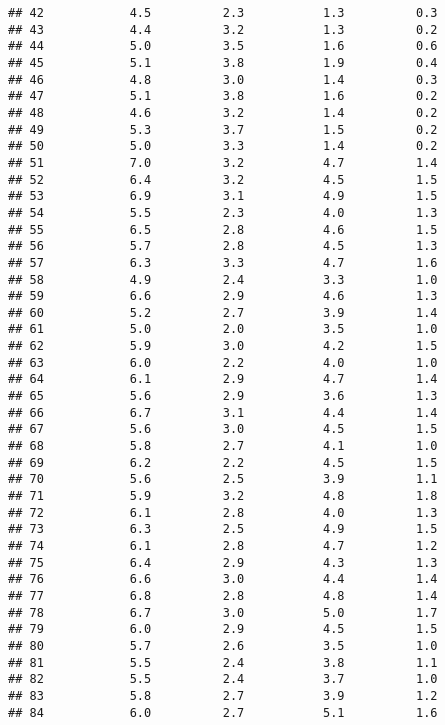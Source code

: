 \documentclass[
]{article}
\begin{document}
\begin{verbatim}
## 42            4.5          2.3           1.3          0.3
## 43            4.4          3.2           1.3          0.2
## 44            5.0          3.5           1.6          0.6
## 45            5.1          3.8           1.9          0.4
## 46            4.8          3.0           1.4          0.3
## 47            5.1          3.8           1.6          0.2
## 48            4.6          3.2           1.4          0.2
## 49            5.3          3.7           1.5          0.2
## 50            5.0          3.3           1.4          0.2
## 51            7.0          3.2           4.7          1.4
## 52            6.4          3.2           4.5          1.5
## 53            6.9          3.1           4.9          1.5
## 54            5.5          2.3           4.0          1.3
## 55            6.5          2.8           4.6          1.5
## 56            5.7          2.8           4.5          1.3
## 57            6.3          3.3           4.7          1.6
## 58            4.9          2.4           3.3          1.0
## 59            6.6          2.9           4.6          1.3
## 60            5.2          2.7           3.9          1.4
## 61            5.0          2.0           3.5          1.0
## 62            5.9          3.0           4.2          1.5
## 63            6.0          2.2           4.0          1.0
## 64            6.1          2.9           4.7          1.4
## 65            5.6          2.9           3.6          1.3
## 66            6.7          3.1           4.4          1.4
## 67            5.6          3.0           4.5          1.5
## 68            5.8          2.7           4.1          1.0
## 69            6.2          2.2           4.5          1.5
## 70            5.6          2.5           3.9          1.1
## 71            5.9          3.2           4.8          1.8
## 72            6.1          2.8           4.0          1.3
## 73            6.3          2.5           4.9          1.5
## 74            6.1          2.8           4.7          1.2
## 75            6.4          2.9           4.3          1.3
## 76            6.6          3.0           4.4          1.4
## 77            6.8          2.8           4.8          1.4
## 78            6.7          3.0           5.0          1.7
## 79            6.0          2.9           4.5          1.5
## 80            5.7          2.6           3.5          1.0
## 81            5.5          2.4           3.8          1.1
## 82            5.5          2.4           3.7          1.0
## 83            5.8          2.7           3.9          1.2
## 84            6.0          2.7           5.1          1.6

\end{verbatim}
\end{document}
